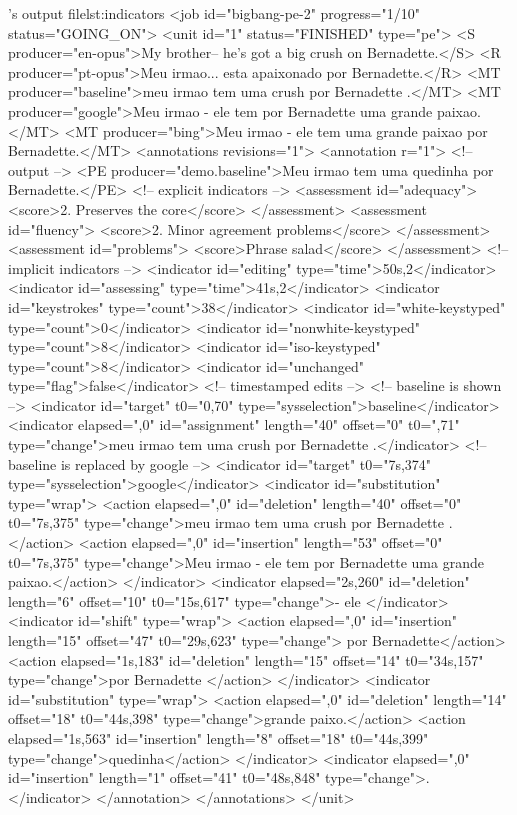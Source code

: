 \begin{workflow-code}{\PET's output file}{lst:indicators}
<job id="bigbang-pe-2" progress="1/10" status="GOING_ON">
  <unit id="1" status="FINISHED" type="pe">
    <S producer="en-opus">My brother-- he's got a big crush on Bernadette.</S>
    <R producer="pt-opus">Meu irmao... esta apaixonado por Bernadette.</R>
    <MT producer="baseline">meu irmao tem uma crush por Bernadette .</MT>
    <MT producer="google">Meu irmao - ele tem por Bernadette uma grande paixao.</MT>
    <MT producer="bing">Meu irmao - ele tem uma grande paixao por Bernadette.</MT>
    <annotations revisions="1">
      <annotation r="1">
        <!-- output -->
        <PE producer="demo.baseline">Meu irmao tem uma quedinha por Bernadette.</PE>
        <!-- explicit indicators -->
        <assessment id="adequacy">
          <score>2. Preserves the core</score>
        </assessment>
        <assessment id="fluency">
          <score>2. Minor agreement problems</score>
        </assessment>
        <assessment id="problems">
          <score>Phrase salad</score>
        </assessment>
        <!-- implicit indicators -->
        <indicator id="editing" type="time">50s,2</indicator>
        <indicator id="assessing" type="time">41s,2</indicator>
        <indicator id="keystrokes" type="count">38</indicator>
        <indicator id="white-keystyped" type="count">0</indicator>
        <indicator id="nonwhite-keystyped" type="count">8</indicator>
        <indicator id="iso-keystyped" type="count">8</indicator>
        <indicator id="unchanged" type="flag">false</indicator>
        <!-- timestamped edits -->
        <!-- baseline is shown -->
        <indicator id="target" t0="0,70" type="sysselection">baseline</indicator>
        <indicator elapsed=",0" id="assignment" length="40" offset="0" t0=",71" type="change">meu irmao tem uma crush por Bernadette .</indicator>
        <!-- baseline is replaced by google -->
        <indicator id="target" t0="7s,374" type="sysselection">google</indicator>
        <indicator id="substitution" type="wrap">
          <action elapsed=",0" id="deletion" length="40" offset="0" t0="7s,375" type="change">meu irmao tem uma crush por Bernadette .</action>
          <action elapsed=",0" id="insertion" length="53" offset="0" t0="7s,375" type="change">Meu irmao - ele tem por Bernadette uma grande paixao.</action>
        </indicator>
        <indicator elapsed="2s,260" id="deletion" length="6" offset="10" t0="15s,617" type="change">- ele </indicator>
        <indicator id="shift" type="wrap">
          <action elapsed=",0" id="insertion" length="15" offset="47" t0="29s,623" type="change"> por Bernadette</action>
          <action elapsed="1s,183" id="deletion" length="15" offset="14" t0="34s,157" type="change">por Bernadette </action>
        </indicator>
        <indicator id="substitution" type="wrap">
          <action elapsed=",0" id="deletion" length="14" offset="18" t0="44s,398" type="change">grande paixo.</action>
          <action elapsed="1s,563" id="insertion" length="8" offset="18" t0="44s,399" type="change">quedinha</action>
        </indicator>
        <indicator elapsed=",0" id="insertion" length="1" offset="41" t0="48s,848" type="change">.</indicator>
      </annotation>
    </annotations>
  </unit>
\end{workflow-code}

